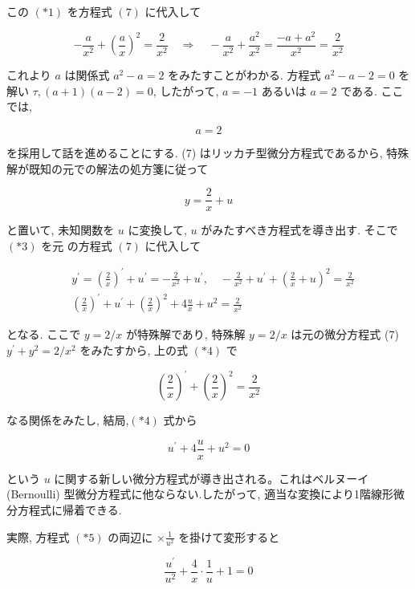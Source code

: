 \documentclass[10pt]{jsarticle}
\begin{document}
この $(* 1)$ を方程式 $(7)$ に代入して

$$
-\frac{a}{x^{2}}+\left(\frac{a}{x}\right)^{2}=\frac{2}{x^{2}} \quad \Longrightarrow \quad-\frac{a}{x^{2}}+\frac{a^{2}}{x^{2}}=\frac{-a+a^{2}}{x^{2}}=\frac{2}{x^{2}}
$$

これより $a$ は関係式 $a^{2}-a=2$ をみたすことがわかる. 方程式 $a^{2}-a-2=0$ を解い $\tau,(a+1)(a-2)=0$, したがって, $a=-1$ あるいは $a=2$ である. ここでは,


\begin{equation*}
a=2 \tag{*2}
\end{equation*}


を採用して話を進めることにする. (7) はリッカチ型微分方程式であるから, 特殊解が既知の元での解法の処方箋に従って


\begin{equation*}
y=\frac{2}{x}+u \tag{*3}
\end{equation*}


と置いて, 未知関数を $u$ に変換して, $u$ がみたすべき方程式を導き出す. そこで $(* 3)$ を元 の方程式 $(7)$ に代入して


\begin{align*}
& y^{\prime}=\left(\frac{2}{x}\right)^{\prime}+u^{\prime}=-\frac{2}{x^{2}}+u^{\prime}, \quad-\frac{2}{x^{2}}+u^{\prime}+\left(\frac{2}{x}+u\right)^{2}=\frac{2}{x^{2}} \\
& \left(\frac{2}{x}\right)^{\prime}+u^{\prime}+\left(\frac{2}{x}\right)^{2}+4 \frac{u}{x}+u^{2}=\frac{2}{x^{2}} \tag{*4}
\end{align*}


となる. ここで $y=2 / x$ が特殊解であり, 特殊解 $y=2 / x$ は元の微分方程式 (7) $y^{\prime}+y^{2}=2 / x^{2}$ をみたすから, 上の式 $(* 4)$ で

$$
\left(\frac{2}{x}\right)^{\prime}+\left(\frac{2}{x}\right)^{2}=\frac{2}{x^{2}}
$$

なる関係をみたし, 結局,$(* 4)$ 式から


\begin{equation*}
u^{\prime}+4 \frac{u}{x}+u^{2}=0 \tag{*5}
\end{equation*}


という $u$ に関する新しい微分方程式が導き出される。これはベルヌーイ (Bernoulli) 型微分方程式に他ならない.したがって, 適当な変換により1階線形微分方程式に帰着できる.

実際, 方程式 $(* 5)$ の両辺に $\times \frac{1}{u^{2}}$ を掛けて変形すると

$$
\frac{u^{\prime}}{u^{2}}+\frac{4}{x} \cdot \frac{1}{u}+1=0
$$
\end{document}
